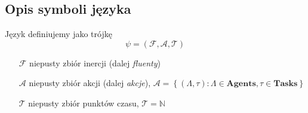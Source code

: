 \subsection{Opis symboli języka}
\begin{definition}
Język definiujemy jako trójkę
\begin{equation}
\psi = \left( \mathcal{F}, \mathcal{A}, \mathcal{T} \right)
\end{equation}
\begin{itemize}
\item[$\mathcal{F}$] niepusty zbiór inercji (dalej \emph{fluenty})
\item[$\mathcal{A}$] niepusty zbiór akcji (dalej \emph{akcje}),
$\mathcal{A} = \left\lbrace (\Lambda, \tau) : \Lambda \in \textbf{Agents}, \tau \in \textbf{Tasks} \right\rbrace$
\item[$\mathcal{T}$] niepusty zbiór punktów czasu, $\mathcal{T} = \mathbb{N}$
\end{itemize}
\end{definition}

